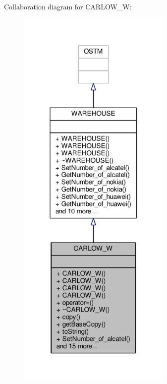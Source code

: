 Collaboration diagram for C\+A\+R\+L\+O\+W\+\_\+W\+:
\nopagebreak
\begin{figure}[H]
\begin{center}
\leavevmode
\includegraphics[width=211pt]{class_c_a_r_l_o_w___w__coll__graph}
\end{center}
\end{figure}
